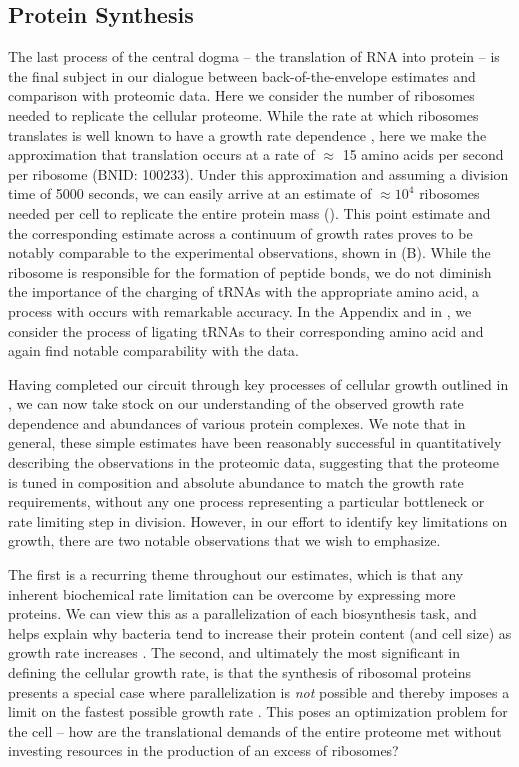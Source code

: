\subsection{Protein Synthesis}
The last process of the central dogma -- the translation of RNA into protein
-- is the final subject in our dialogue between back-of-the-envelope
estimates and comparison with proteomic data. Here we consider the number of
ribosomes needed to replicate the cellular proteome. While the rate at which
ribosomes translates is well known to have a growth rate dependence
\citep{dai2018}, here we make the approximation that translation occurs at a
rate of $\approx$ 15 amino acids per second per ribosome (BNID: 100233).
Under this approximation and assuming a division time of 5000 seconds, we can
easily arrive at an estimate of $\approx 10^4$ ribosomes needed per cell to
replicate the entire protein mass (). This point
estimate and the corresponding estimate across a continuum of growth rates
proves to be notably comparable to the experimental observations, shown in
(B). While the ribosome is responsible for the
formation of peptide bonds, we do not diminish the importance of the charging
of tRNAs with the appropriate amino acid, a process with occurs with
remarkable accuracy. In the Appendix and in
, we consider the process of ligating tRNAs
to their corresponding amino acid and again find notable comparability with
the data.

Having completed our circuit through key processes of cellular growth
outlined in , we can now take stock on our understanding of the
observed growth rate dependence and abundances of various protein complexes. We
note that in general, these simple estimates have been reasonably successful in
quantitatively describing the observations in the proteomic data, suggesting
that the proteome is tuned in composition and absolute abundance to match the
growth rate requirements, without any one process representing a particular
bottleneck or rate limiting step in division. However, in our effort to identify
key limitations on growth, there are two notable observations that we wish to
emphasize.

The first is a recurring theme throughout our estimates, which is that any
inherent biochemical rate limitation can be overcome by expressing more
proteins. We can view this as a parallelization of each biosynthesis task,
and helps explain why bacteria tend to increase their protein content (and
cell size) as growth rate increases \citep{ojkic2019}. The second, and ultimately
the most significant in defining the cellular growth rate, is that the
synthesis of ribosomal proteins presents a special case where parallelization
is \textit{not} possible and thereby imposes a limit on the fastest possible
growth rate \citep{dill2011}. This poses an optimization problem for
the cell -- how are the translational demands of the entire proteome met without
investing resources in the production of an excess of ribosomes?

